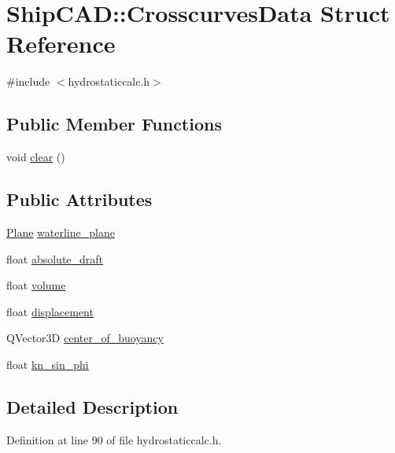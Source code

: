 \hypertarget{structShipCAD_1_1CrosscurvesData}{}\section{Ship\+C\+AD\+:\+:Crosscurves\+Data Struct Reference}
\label{structShipCAD_1_1CrosscurvesData}


{\ttfamily \#include $<$hydrostaticcalc.\+h$>$}

\subsection*{Public Member Functions}
\begin{DoxyCompactItemize}
\item 
void \hyperlink{structShipCAD_1_1CrosscurvesData_a2fcb82c940ad6a13c07a25f44bbd5efd}{clear} ()
\end{DoxyCompactItemize}
\subsection*{Public Attributes}
\begin{DoxyCompactItemize}
\item 
\hyperlink{classShipCAD_1_1Plane}{Plane} \hyperlink{structShipCAD_1_1CrosscurvesData_a1ea6de1b52289e8392e8d499ae4aad04}{waterline\+\_\+plane}
\item 
float \hyperlink{structShipCAD_1_1CrosscurvesData_a759e5729cdb86d8367b139e66fecb7d3}{absolute\+\_\+draft}
\item 
float \hyperlink{structShipCAD_1_1CrosscurvesData_a9bec38a77bf87ab5feb76899e39e4f7b}{volume}
\item 
float \hyperlink{structShipCAD_1_1CrosscurvesData_a9a7baa66159e203888390eaa63caf708}{displacement}
\item 
Q\+Vector3D \hyperlink{structShipCAD_1_1CrosscurvesData_a0de723cd5ae0e18953fb7ad5a0f5dadf}{center\+\_\+of\+\_\+buoyancy}
\item 
float \hyperlink{structShipCAD_1_1CrosscurvesData_a55150860fed821e314e18b72f1975749}{kn\+\_\+sin\+\_\+phi}
\end{DoxyCompactItemize}


\subsection{Detailed Description}


Definition at line 90 of file hydrostaticcalc.\+h.



